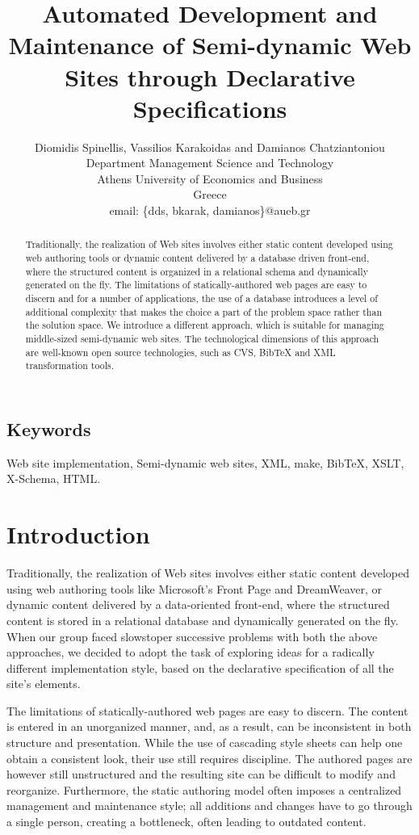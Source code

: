 \documentclass[10pt]{article}
\title{Automated Development and Maintenance of Semi-dynamic Web Sites through Declarative Specifications}
\author{Diomidis Spinellis, Vassilios Karakoidas and Damianos Chatziantoniou\\
Department Management Science and Technology \\
Athens University of Economics and Business \\
Greece\\
email: \{dds, bkarak, damianos\}@aueb.gr}
\date{}
\begin{document}
\maketitle

\begin{abstract}
\noindent
Traditionally, the realization of Web sites involves either
static content developed using web authoring tools or dynamic
content delivered by a database driven front-end,
where the structured content is organized
in a relational schema and dynamically generated on the fly.
The limitations of statically-authored web pages are easy to discern and
for a number of applications, the use of a database
introduces a level of additional complexity that
makes the choice a part of the problem space rather than the solution space.
We introduce a different approach, which is suitable for managing 
middle-sized semi-dynamic web sites. The technological dimensions of this
approach are well-known open source technologies, such as {\sc CVS}, BibTeX 
and {\sc XML} transformation tools.
\end{abstract}

\subsection*{Keywords}
Web site implementation, Semi-dynamic web sites, {\sc XML}, make, BibTeX, {\sc XSLT}, X-Schema, {\sc HTML}.

\section{Introduction}
\label{sec:intro}
Traditionally, the realization of Web sites involves either
static content developed using web authoring tools like
Microsoft's Front Page and DreamWeaver, or dynamic
content delivered by a data-oriented front-end,
where the structured content is stored in a relational database 
and dynamically generated on the fly.
When our group faced slowstoper successive problems with both the above approaches,
we decided to adopt the task of exploring ideas for a radically different
implementation style, based on the declarative specification
of all the site's elements.

The limitations of statically-authored web pages are easy to discern.
The content is entered in an unorganized manner, and, as a result,
can be inconsistent in both structure and presentation.
While the use of cascading style sheets can help one obtain a
consistent look, their use still requires discipline.
The authored pages are however still unstructured and the resulting
site can be difficult to modify and reorganize.
Furthermore, the static authoring model often imposes a centralized
management and maintenance style;
all additions and changes have to go through a single person,
creating a bottleneck, often leading to outdated content.
\end{document}
